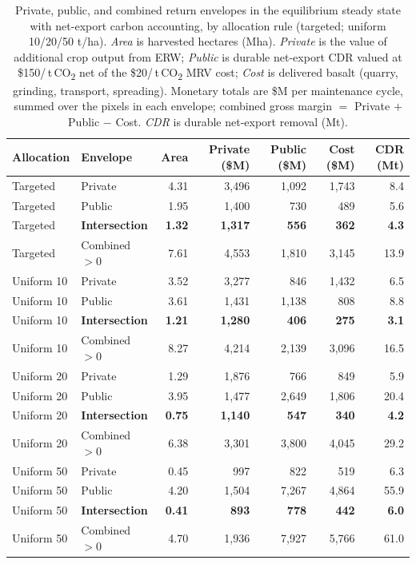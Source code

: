 \documentclass[12pt]{article}
\newcommand{\tco}{\,t\,CO\textsubscript{2}}
\begin{document}
\begin{table}[t]
\centering
\caption{Private, public, and combined return envelopes in the equilibrium steady
state with net-export carbon accounting, by allocation rule (targeted; uniform
10/20/50 t/ha). \emph{Area} is harvested hectares (Mha). \emph{Private} is the value of additional crop output
from ERW; \emph{Public} is durable net-export CDR valued at \$150/\tco{} net of
the \$20/\tco{} MRV cost; \emph{Cost} is delivered basalt (quarry, grinding,
transport, spreading). Monetary totals are \$M per maintenance cycle, summed over
the pixels in each envelope; combined gross margin $=$ Private $+$ Public $-$
Cost. \emph{CDR} is durable net-export removal (Mt).}
\label{tab:envelopes}
\footnotesize
\setlength{\tabcolsep}{4.5pt}
\begin{tabular}{llrrrrr}
\toprule
Allocation & Envelope & Area & Private (\$M) & Public (\$M) & Cost (\$M) & CDR (Mt) \\
\midrule
Targeted   & Private        & 4.31 & 3{,}496 & 1{,}092 & 1{,}743 & 8.4 \\
Targeted   & Public         & 1.95 & 1{,}400 & 730 & 489 & 5.6 \\
Targeted   & \textbf{Intersection} & \textbf{1.32} & \textbf{1{,}317} & \textbf{556} & \textbf{362} & \textbf{4.3} \\
Targeted   & Combined $>0$  & 7.61 & 4{,}553 & 1{,}810 & 3{,}145 & 13.9 \\
\midrule
Uniform 10 & Private        & 3.52 & 3{,}277 & 846 & 1{,}432 & 6.5 \\
Uniform 10 & Public         & 3.61 & 1{,}431 & 1{,}138 & 808 & 8.8 \\
Uniform 10 & \textbf{Intersection} & \textbf{1.21} & \textbf{1{,}280} & \textbf{406} & \textbf{275} & \textbf{3.1} \\
Uniform 10 & Combined $>0$  & 8.27 & 4{,}214 & 2{,}139 & 3{,}096 & 16.5 \\
\midrule
Uniform 20 & Private        & 1.29 & 1{,}876 & 766 & 849 & 5.9 \\
Uniform 20 & Public         & 3.95 & 1{,}477 & 2{,}649 & 1{,}806 & 20.4 \\
Uniform 20 & \textbf{Intersection} & \textbf{0.75} & \textbf{1{,}140} & \textbf{547} & \textbf{340} & \textbf{4.2} \\
Uniform 20 & Combined $>0$  & 6.38 & 3{,}301 & 3{,}800 & 4{,}045 & 29.2 \\
\midrule
Uniform 50 & Private        & 0.45 & 997 & 822 & 519 & 6.3 \\
Uniform 50 & Public         & 4.20 & 1{,}504 & 7{,}267 & 4{,}864 & 55.9 \\
Uniform 50 & \textbf{Intersection} & \textbf{0.41} & \textbf{893} & \textbf{778} & \textbf{442} & \textbf{6.0} \\
Uniform 50 & Combined $>0$  & 4.70 & 1{,}936 & 7{,}927 & 5{,}766 & 61.0 \\
\bottomrule
\end{tabular}
\end{table}
\end{document}
